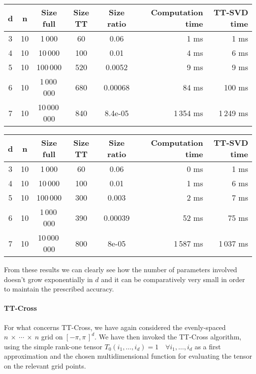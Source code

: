 \begin{center}
  \begin{tabular}[t]{cccccrr}
    \toprule
    d & n  & Size full & Size TT & Size ratio & Computation time & TT-SVD time\\ \midrule
    3 & 10 & 1\,000      &60&0.06 & 1 ms & 1 ms\\
    4 & 10 & 10\,000     &100&0.01 & 4 ms & 6 ms\\
    5 & 10 & 100\,000    &520&0.0052 & 9 ms & 9 ms\\
    6 & 10 & 1\,000\,000   &680&0.00068 & 84 ms & 100 ms\\
    7 & 10 & 10\,000\,000  &840&8.4e-05& 1\,354 ms & 1\,249 ms\\ \bottomrule
  \end{tabular}
\end{center}

\begin{center}
  \begin{tabular}[t]{cccccrr}
    \toprule
    d & n  & Size full & Size TT & Size ratio & Computation time & TT-SVD time\\ \midrule
    3 & 10 & 1\,000      &60&0.06& 0 ms & 1 ms\\
    4 & 10 & 10\,000     &100&0.01& 1 ms & 6 ms\\
    5 & 10 & 100\,000    &300&0.003& 2 ms & 7 ms\\
    6 & 10 & 1\,000\,000   &390&0.00039& 52 ms & 75 ms\\
    7 & 10 & 10\,000\,000  &800&8e-05& 1\,587 ms & 1\,037 ms\\ \bottomrule
  \end{tabular}
\end{center}

From these results we can clearly see how the number of parameters involved doesn't grow exponentially in $d$ and it can be comparatively very small in order to maintain the prescribed accuracy.

\paragraph{TT-Cross}
For what concerns TT-Cross, we have again considered the evenly-spaced $n~\times~\cdots~\times~n$ grid on $[-\pi,\pi\,]^d$. We have then invoked the TT-Cross algorithm, using the simple rank-one tensor $T_0(i_1,\ldots,i_d) = 1 \quad \forall i_1,\ldots,i_d$ as a first approximation and the chosen multidimensional function for evaluating the tensor on the relevant grid points.

